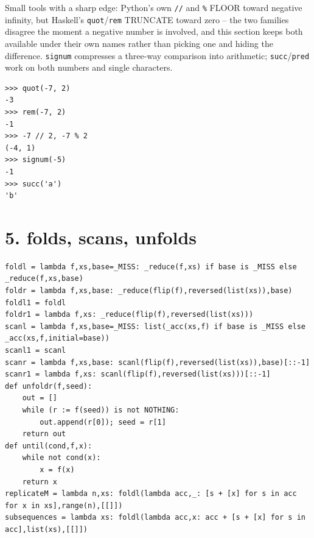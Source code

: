 \documentclass[10pt,letterpaper]{book}
\begin{document}
Small tools with a sharp edge: Python's own \texttt{//} and \texttt{\%} FLOOR toward negative
infinity, but Haskell's \texttt{quot}/\texttt{rem} TRUNCATE toward zero -- the two families disagree
the moment a negative number is involved, and this section keeps both available under their own
names rather than picking one and hiding the difference. \texttt{signum} compresses a three-way
comparison into arithmetic; \texttt{succ}/\texttt{pred} work on both numbers and single characters.
\begin{lstlisting}[style=ex]
>>> quot(-7, 2)
-3
>>> rem(-7, 2)
-1
>>> -7 // 2, -7 % 2
(-4, 1)
>>> signum(-5)
-1
>>> succ('a')
'b'
\end{lstlisting}
\section*{5. folds, scans, unfolds}
\begin{lstlisting}[style=code]
foldl = lambda f,xs,base=_MISS: _reduce(f,xs) if base is _MISS else _reduce(f,xs,base)
foldr = lambda f,xs,base: _reduce(flip(f),reversed(list(xs)),base)
foldl1 = foldl
foldr1 = lambda f,xs: _reduce(flip(f),reversed(list(xs)))
scanl = lambda f,xs,base=_MISS: list(_acc(xs,f) if base is _MISS else _acc(xs,f,initial=base))
scanl1 = scanl
scanr = lambda f,xs,base: scanl(flip(f),reversed(list(xs)),base)[::-1]
scanr1 = lambda f,xs: scanl(flip(f),reversed(list(xs)))[::-1]
def unfoldr(f,seed):
    out = []
    while (r := f(seed)) is not NOTHING:
        out.append(r[0]); seed = r[1]
    return out
def until(cond,f,x):
    while not cond(x):
        x = f(x)
    return x
replicateM = lambda n,xs: foldl(lambda acc,_: [s + [x] for s in acc for x in xs],range(n),[[]])
subsequences = lambda xs: foldl(lambda acc,x: acc + [s + [x] for s in acc],list(xs),[[]])
\end{lstlisting}
\end{document}
